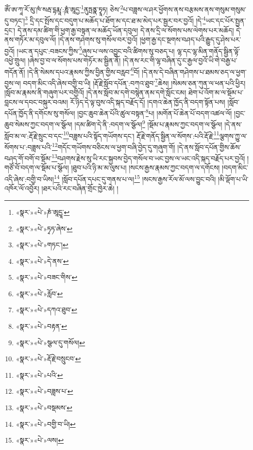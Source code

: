 ཨོཾ་ཨ་ཀཱ་རོ་མུ་ཁཾ་སརྦ་དྷརྨཱ་:ཎཱཾ་ཨཱདྱ་\footnote{«སྣར་»«པེ་»ཎཾ་ཨཱདྱཱ་}ནུཏྤནྣ་ཏྭཱཏ། ཅེས་\footnote{«སྣར་»«པེ་»ཏྭཏ་ཞེས་}པ་བཟླས་ལ་ཤར་ཕྱོགས་ནས་བརྩམས་ནས་གསུམ་གསུམ་དུ་བཏང་།\footnote{«སྣར་»«པེ་»གཏང་།} དྲི་དང་སྤོས་དང་བདུག་པ་མཆོད་པ་ཐོག་མ་དང་ཐ་མ་མེད་པར་སྦྱར་བར་བྱའོ། །དེ་\footnote{«སྣར་»«པེ་»དེ་ནས་}ཡང་དང་པོར་སྤྱན་དྲང་། དེ་ནས་དམ་ཚིག་གི་ཕྱག་རྒྱ་བསྟན་ལ་མཆོད་ཡོན་དབུལ། དེ་ནས་དྲི་ལ་སོགས་པས་ལེགས་པར་མཆོད། དེ་ནས་གཏོར་མ་དབུལ་ལོ། །དེ་ནས་གཤེགས་སུ་གསོལ་བར་བྱའོ། །ཕྱག་རྒྱ་དང་སྔགས་བཤད་པའི་རྒྱུད་དུ་ཤེས་པར་བྱའོ། །ཡང་ན་དཔུང་:བཟངས་ཀྱིས་\footnote{«སྣར་»«པེ་»བཟང་གིས་}ཞུས་པ་ལས་འབྱུང་བའི་ཚིགས་སུ་བཅད་པ། ལྷ་དང་ལྷ་མིན་གནོད་སྦྱིན་ལྟོ་འཕྱེ་གྲུལ། །ཞེས་བྱ་བ་ལ་སོགས་པས་གཏོར་མ་སྦྱིན་ནོ། །དེ་ནས་རང་གི་ལྷ་བཞིན་དུ་ང་རྒྱལ་བྱའོ་ཡི་གེ་བརྒྱ་པ་གདོན་ནོ། །དེ་ནི་སེམས་དཔའ་རྣམས་ཀྱིས་བྱིན་གྱིས་བརླབ་\footnote{«སྣར་»«པེ་»རློབ་}བོ། །དེ་ནས་དེ་བཞིན་གཤེགས་པ་ཐམས་ཅད་ལ་ཕྱག་བྱས་ལ། བདག་མིང་འདི་ཞེས་བགྱི་བ་ཡི། །རྡོ་རྗེ་སློབ་དཔོན་:བཀའ་ཐུབ་\footnote{«སྣར་»«པེ་»དཀའ་ཐུབ་}ཆེས། །སེམས་ཅན་ཀུན་ལ་ཕན་པའི་ཕྱིར། །སློབ་མ་རྣམས་ནི་གཞུག་པར་བགྱིའོ། །དེ་ནས་སློབ་མ་དགེ་བསྙེན་ནམ་དགེ་སློང་ངམ། ཐེག་པ་འོག་མ་ལ་སྡོམ་པ་བླངས་ལ་དབང་བསྐུར་བའམ། རོ་ཉིད་དེ་ལྟ་བུས་འདི་སྐད་བརྗོད་དོ། །དགའ་ཆེན་ཁྱོད་ནི་བདག་སྟོན་པས། །སློབ་དཔོན་ཁྱོད་ནི་དགོངས་སུ་གསོལ། །བྱང་ཆུབ་ཆེན་པོའི་ཚུལ་བསྟན་\footnote{«སྣར་»«པེ་»བརྟན་}པ། །མགོན་པོ་ཆེན་པོ་བདག་འཚལ་ལོ། །བྱང་ཆུབ་སེམས་ཀྱང་བདག་ལ་སྩོལ། །དམ་ཚིག་དེ་ནི་:བདག་ལ་སྩོལ།\footnote{«སྣར་»«པེ་»སྩལ་དུ་གསོལ།} །སྡོམ་པ་རྣམས་ཀྱང་བདག་ལ་སྩོལ། །དེ་ནས་སློབ་མ་ལ་:རྡོ་རྗེ་སྲུང་བ་དང་\footnote{«སྣར་»«པེ་»རྡོ་རྗེ་བསྲུངབ་}བཟླས་པའི་སྟོད་གཡོགས་དང་། རྡོ་རྗེ་གནོད་སྦྱིན་ལ་སོགས་:པའི་རྡོ་རྗེ་\footnote{«སྣར་»«པེ་»པའི་}ལྕགས་ཀྱུ་ལ་སོགས་པ་:བཟླས་པའི་\footnote{«སྣར་»«པེ་»བཟླས་པ་}གདོང་གཡོགས་བཅིངས་ལ་ཕྱག་བཞི་བྱེད་དུ་གཞུག་གོ། །དེ་ནས་སློབ་དཔོན་གྱིས་ཆོས་བཤད་གོ་བགོ་བ་སྡོམ་\footnote{«སྣར་»«པེ་»བསྡམས་}བཤགས་རྗེས་སུ་ཡི་རང་སྐྱབས་བྱེད་གསོལ་བ་ཡང་བྱས་ལ་ཡང་འདི་སྐད་བརྗོད་པར་བྱའོ། །གཙོ་བོ་བདག་ལ་སྡོམ་པ་སྩོལ། །ཐུབ་པའི་ཉི་མ་མ་ལུས་པ། །སངས་རྒྱས་རྣམས་ཀྱང་བདག་ལ་དགོངས། །བདག་མིང་འདི་ཞེས་:བགྱི་བ་ཡིས།\footnote{«སྣར་»«པེ་»བགྱི་བ་ཡི།} །སློབ་དཔོན་དཔང་དུ་གནས་པ་ལ།\footnote{«སྣར་»«པེ་»ལས།} །སངས་རྒྱས་རོལ་མོ་ལས་བྱུང་བའི། །མི་ལྡོག་པ་ཡི་འཁོར་ལོ་འབྱོར། །ཐར་པའི་རང་བཞིན་གྲོང་ཁྱེར་ཆེ། །
